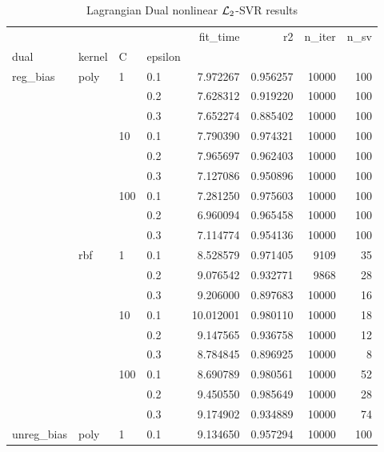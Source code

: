 \begin{table}[H]
\centering
\caption{Lagrangian Dual nonlinear $\protect \mathcal{L}_2$-SVR results}
\label{nonlinear_lagrangian_dual_l2_svr_cv_results}
\begin{tabular}{llllrrrr}
\toprule
           &     &     &     &   fit\_time &        r2 &  n\_iter &  n\_sv \\
dual & kernel & C & epsilon &            &           &         &       \\
\midrule
reg\_bias & poly & 1   & 0.1 &   7.972267 &  0.956257 &   10000 &   100 \\
           &     &     & 0.2 &   7.628312 &  0.919220 &   10000 &   100 \\
           &     &     & 0.3 &   7.652274 &  0.885402 &   10000 &   100 \\
           &     & 10  & 0.1 &   7.790390 &  0.974321 &   10000 &   100 \\
           &     &     & 0.2 &   7.965697 &  0.962403 &   10000 &   100 \\
           &     &     & 0.3 &   7.127086 &  0.950896 &   10000 &   100 \\
           &     & 100 & 0.1 &   7.281250 &  0.975603 &   10000 &   100 \\
           &     &     & 0.2 &   6.960094 &  0.965458 &   10000 &   100 \\
           &     &     & 0.3 &   7.114774 &  0.954136 &   10000 &   100 \\
           & rbf & 1   & 0.1 &   8.528579 &  0.971405 &    9109 &    35 \\
           &     &     & 0.2 &   9.076542 &  0.932771 &    9868 &    28 \\
           &     &     & 0.3 &   9.206000 &  0.897683 &   10000 &    16 \\
           &     & 10  & 0.1 &  10.012001 &  0.980110 &   10000 &    18 \\
           &     &     & 0.2 &   9.147565 &  0.936758 &   10000 &    12 \\
           &     &     & 0.3 &   8.784845 &  0.896925 &   10000 &     8 \\
           &     & 100 & 0.1 &   8.690789 &  0.980561 &   10000 &    52 \\
           &     &     & 0.2 &   9.450550 &  0.985649 &   10000 &    28 \\
           &     &     & 0.3 &   9.174902 &  0.934889 &   10000 &    74 \\
unreg\_bias & poly & 1   & 0.1 &   9.134650 &  0.957294 &   10000 &   100 \\

\end{tabular}
\end{table}
